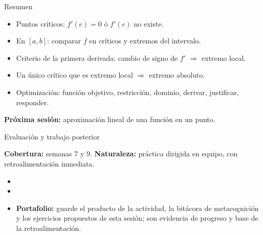 \documentclass[10pt,aspectratio=169]{beamer}
\begin{document}
\begin{frame}{Resumen}
  \begin{itemize}
    \item Puntos críticos: $f'(c)=0$ ó $f'(c)$ no existe.
    \item En $[a,b]$: comparar $f$ en críticos y extremos del intervalo.
    \item Criterio de la primera derivada: cambio de signo de $f'$ $\Rightarrow$ extremo local.
    \item Un único crítico que es extremo local $\Rightarrow$ extremo absoluto.
    \item Optimización: función objetivo, restricción, dominio, derivar, justificar, responder.
  \end{itemize}
  \vspace{3mm}
  \textbf{Próxima sesión:} aproximación lineal de una función en un punto.
\end{frame}


\begin{frame}{Evaluación y trabajo posterior}
  \small
  \begin{evalbox}
    \textbf{Cobertura:} semanas 7 y 9. \textbf{Naturaleza:} práctica dirigida en equipo, con retroalimentación inmediata.
  \end{evalbox}
  \begin{itemize}
    \item \criterios
    \item \declaracionia
    \item \textbf{Portafolio:} guarde el producto de la actividad, la bitácora de metacognición y los ejercicios propuestos de esta sesión; son evidencia de progreso y base de la retroalimentación.
  \end{itemize}
\end{frame}
\end{document}

